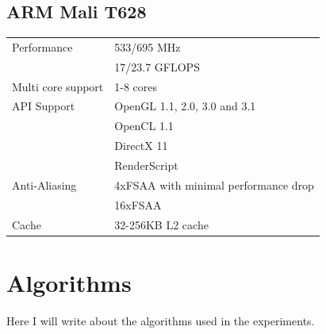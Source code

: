 \subsection{ARM Mali T628}
\begin{table}[H]
  \begin{tabular}{ll}
    Performance       & 533/695 MHz \\
                      & 17/23.7 GFLOPS \\
    Multi core support & 1-8 cores  \\
    API Support       & OpenGL 1.1, 2.0, 3.0 and 3.1  \\
                      & OpenCL 1.1  \\
                      & DirectX 11  \\
                      & RenderScript \\
    Anti-Aliasing     & 4xFSAA with minimal performance drop  \\
                      & 16xFSAA  \\
    Cache             & 32-256KB L2 cache
  \end{tabular}
\end{table}

\section{Algorithms}
Here I will write about the algorithms used in the experiments.

